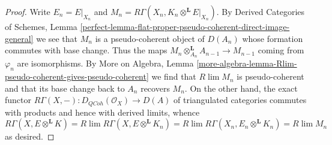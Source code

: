 \documentclass[10pt,a4paper]{amsart}
\theoremstyle{plain}
\theoremstyle{definition}
\theoremstyle{remark}
\numberwithin{equation}{subsection}
\def\lim{\mathop{\mathrm{lim}}\nolimits}
\def\QCoh{\mathit{QCoh}}
\begin{document}
\begin{proof}
Write $E_n = E|_{X_n}$ and
$M_n = R\Gamma(X_n, K_n \otimes^\mathbf{L} E|_{X_n})$.
By Derived Categories of Schemes, Lemma
\ref{perfect-lemma-flat-proper-pseudo-coherent-direct-image-general}
we see that $M_n$ is a pseudo-coherent object of $D(A_n)$
whose formation commutes with base change. Thus the maps
$M_n \otimes_{A_n}^\mathbf{L} A_{n - 1} \to M_{n - 1}$
coming from $\varphi_n$ are isomorphisms. By
More on Algebra, Lemma
\ref{more-algebra-lemma-Rlim-pseudo-coherent-gives-pseudo-coherent}
we find that $R\lim M_n$ is pseudo-coherent and
that its base change back to $A_n$ recovers $M_n$.
On the other hand, the exact functor
$R\Gamma(X, -) : D_\QCoh(\mathcal{O}_X) \to D(A)$
of triangulated categories commutes with products
and hence with derived limits, whence
$$
R\Gamma(X, E \otimes^\mathbf{L} K) =
R\lim R\Gamma(X,  E \otimes^\mathbf{L} K_n) =
R\lim R\Gamma(X_n, E_n \otimes^\mathbf{L} K_n) =
R\lim M_n
$$
as desired.
\end{proof}
\end{document}
